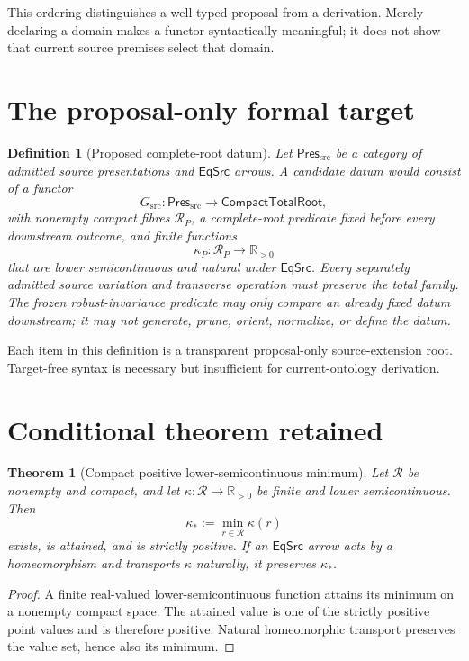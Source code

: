 \documentclass[11pt]{article}
\newtheorem{definition}{Definition}
\newtheorem{theorem}{Theorem}
\newcommand{\R}{\mathbb R}
\newcommand{\EqSrc}{\mathsf{EqSrc}}
\newcommand{\PresSrc}{\mathsf{Pres}_{\mathrm{src}}}
\newcommand{\GSrc}{G_{\mathrm{src}}}
\begin{document}
This ordering distinguishes a well-typed proposal from a derivation.  Merely
declaring a domain makes a functor syntactically meaningful; it does not show
that current source premises select that domain.

\section{The proposal-only formal target}

\begin{definition}[Proposed complete-root datum]
Let \(\PresSrc\) be a category of admitted source presentations and
\(\EqSrc\) arrows.  A candidate datum would consist of a functor
\[
  \GSrc:\PresSrc\longrightarrow\mathsf{CompactTotalRoot},
\]
with nonempty compact fibres \(\mathcal R_P\), a complete-root predicate fixed
before every downstream outcome, and finite functions
\[
  \kappa_P:\mathcal R_P\longrightarrow\R_{>0}
\]
that are lower semicontinuous and natural under \(\EqSrc\).  Every separately
admitted source variation and transverse operation must preserve the total
family.  The frozen robust-invariance predicate may only compare an already
fixed datum downstream; it may not generate, prune, orient, normalize, or
define the datum.
\end{definition}

Each item in this definition is a transparent proposal-only source-extension
root.  Target-free syntax is necessary but insufficient for current-ontology
derivation.

\section{Conditional theorem retained}

\begin{theorem}[Compact positive lower-semicontinuous minimum]
Let \(\mathcal R\) be nonempty and compact, and let
\(\kappa:\mathcal R\to\R_{>0}\) be finite and lower semicontinuous.  Then
\[
  \kappa_*:=\min_{r\in\mathcal R}\kappa(r)
\]
exists, is attained, and is strictly positive.  If an \(\EqSrc\) arrow acts
by a homeomorphism and transports \(\kappa\) naturally, it preserves
\(\kappa_*\).
\end{theorem}

\begin{proof}
A finite real-valued lower-semicontinuous function attains its minimum on a
nonempty compact space.  The attained value is one of the strictly positive
point values and is therefore positive.  Natural homeomorphic transport
preserves the value set, hence also its minimum.
\end{proof}
\end{document}
